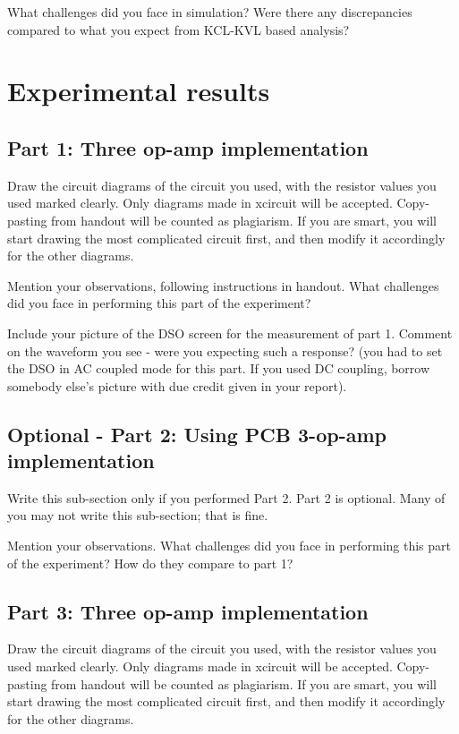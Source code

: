 ﻿\documentclass[12pt]{article}
\begin{document}
What challenges did you face in simulation? Were there any discrepancies compared to what you expect from KCL-KVL based analysis?

\section{Experimental results}

\subsection{Part 1: Three op-amp implementation}

Draw the circuit diagrams of the circuit you used, with the resistor values you used marked clearly. Only diagrams made in xcircuit will be accepted. Copy-pasting from handout will be counted as plagiarism. If you are smart, you will start drawing the most complicated circuit first, and then modify it accordingly for the other diagrams.

Mention your observations, following instructions in handout. What challenges did you face in performing this part of the experiment?

Include your picture of the DSO screen for the measurement of part 1. Comment on the waveform  you see - were you expecting such a response? (you had to set the DSO in AC coupled mode for this part. If you used DC coupling, borrow somebody else's picture with due credit given in your report).

\subsection{Optional - Part 2: Using PCB 3-op-amp implementation}

Write this sub-section only if you performed Part 2. Part 2 is optional. Many of you may not write this sub-section; that is fine.

Mention your observations. What challenges did you face in performing this part of the experiment? How do they compare to part 1?

\subsection{Part 3: Three op-amp implementation}

Draw the circuit diagrams of the circuit you used, with the resistor values you used marked clearly. Only diagrams made in xcircuit will be accepted. Copy-pasting from handout will be counted as plagiarism. If you are smart, you will start drawing the most complicated circuit first, and then modify it accordingly for the other diagrams.
\end{document}
